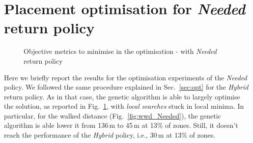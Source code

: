 \section{Placement optimisation for \textit{Needed} return policy}
\label{sec:needed}

 
 \begin{figure}[h]
     \centering     %
     \caption{Objective metrics to minimise in the optimisation - with \textit{Needed} return policy}
    \label{fig:optimized_metrics_needed}
 \end{figure}
 
Here  we briefly report the results for the optimisation experiments of the \textit{Needed} policy.
We followed the same procedure explained in Sec.~\ref{sec:opt} for the \textit{Hybrid} return policy. As in that case, the genetic algorithm is able to largely optimise the solution, as reported in Fig.~\ref{fig:optimized_metrics_needed}, with \textit{local searches} stuck in local minima. 
In particular, for the walked distance (Fig.~\ref{fig:wwd_Needed}), the genetic algorithm is able lower it from 136\,m to 45\,m at 13\% of zones. Still, it doesn't reach the performance of the \textit{Hybrid} policy, i.e., 30\,m at 13\% of zones.


